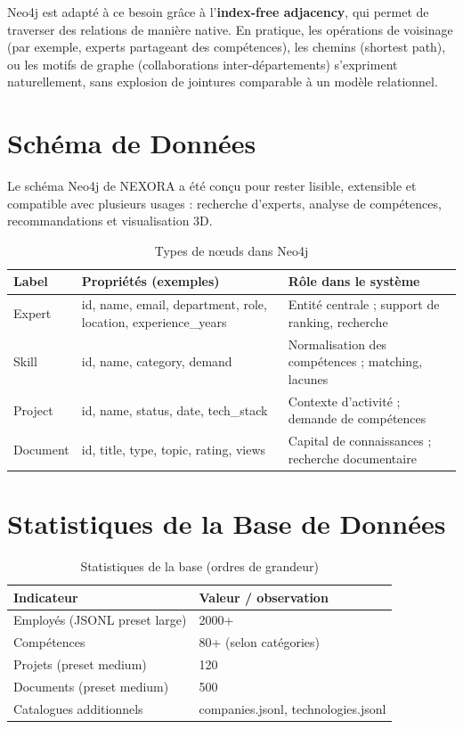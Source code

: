 \documentclass[12pt,a4paper]{report}
\begin{document}
Neo4j est adapté à ce besoin grâce à l'\textbf{index-free adjacency}, qui permet de traverser des relations de manière native. En pratique, les opérations de voisinage (par exemple, experts partageant des compétences), les chemins (shortest path), ou les motifs de graphe (collaborations inter-départements) s'expriment naturellement, sans explosion de jointures comparable à un modèle relationnel.

\section{Schéma de Données}
Le schéma Neo4j de NEXORA a été conçu pour rester lisible, extensible et compatible avec plusieurs usages : recherche d'experts, analyse de compétences, recommandations et visualisation 3D.

\begin{table}[H]
\centering
\caption{Types de nœuds dans Neo4j}
\label{tab:neo4j_nodes}
\begin{tabular}{p{3.2cm} p{4cm} p{7cm}}
\toprule
\textbf{Label} & \textbf{Propriétés (exemples)} & \textbf{Rôle dans le système} \\
\midrule
Expert & id, name, email, department, role, location, experience\_years & Entité centrale ; support de ranking, recherche \\
Skill & id, name, category, demand & Normalisation des compétences ; matching, lacunes \\
Project & id, name, status, date, tech\_stack & Contexte d'activité ; demande de compétences \\
Document & id, title, type, topic, rating, views & Capital de connaissances ; recherche documentaire \\
\bottomrule
\end{tabular}
\end{table}

\section{Statistiques de la Base de Données}
\begin{table}[H]
\centering
\caption{Statistiques de la base (ordres de grandeur)}
\label{tab:neo4j_stats}
\begin{tabular}{p{6cm} p{7cm}}
\toprule
\textbf{Indicateur} & \textbf{Valeur / observation} \\
\midrule
Employés (JSONL preset large) & 2000+ \\
Compétences & 80+ (selon catégories) \\
Projets (preset medium) & 120 \\
Documents (preset medium) & 500 \\
Catalogues additionnels & companies.jsonl, technologies.jsonl \\
\bottomrule
\end{tabular}
\end{table}
\end{document}
